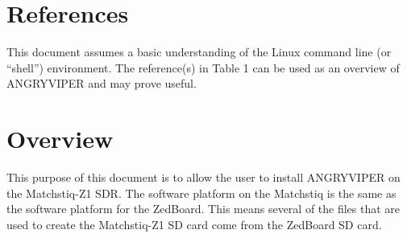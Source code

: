 \newpage

\tableofcontents

\newpage

\section{References}

	This document assumes a basic understanding of the Linux command line (or ``shell'') environment.  The reference(s) in Table 1 can be used as an overview of ANGRYVIPER and may prove useful.

\def\refcapbottom{}


\newpage
\section{Overview}
This purpose of this document is to allow the user to install ANGRYVIPER on the Matchstiq-Z1 SDR.  The software platform on the Matchstiq is the same as the software platform for the ZedBoard. This means several of the files that are used to create the Matchstiq-Z1 SD card come from the ZedBoard SD card.
